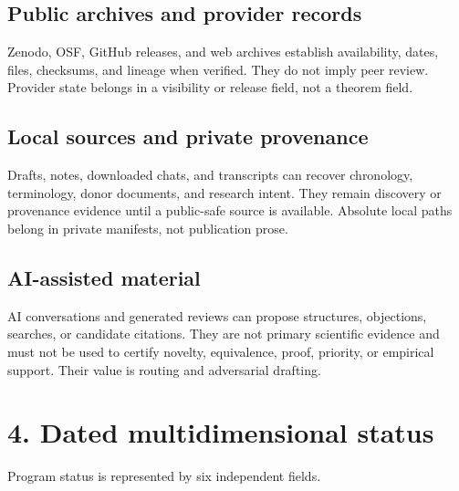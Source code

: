 \documentclass[
  american,
  11pt,
  letterpaper,
]{article}
\begin{document}
\subsection{Public archives and provider records}\label{public-archives-and-provider-records}

Zenodo, OSF, GitHub releases, and web archives establish availability, dates, files, checksums, and lineage when verified. They do not imply peer review. Provider state belongs in a visibility or release field, not a theorem field.

\subsection{Local sources and private provenance}\label{local-sources-and-private-provenance}

Drafts, notes, downloaded chats, and transcripts can recover chronology, terminology, donor documents, and research intent. They remain discovery or provenance evidence until a public-safe source is available. Absolute local paths belong in private manifests, not publication prose.

\subsection{AI-assisted material}\label{ai-assisted-material}

AI conversations and generated reviews can propose structures, objections, searches, or candidate citations. They are not primary scientific evidence and must not be used to certify novelty, equivalence, proof, priority, or empirical support. Their value is routing and adversarial drafting.

\section{4. Dated multidimensional status}\label{dated-multidimensional-status}

Program status is represented by six independent fields.
\end{document}
